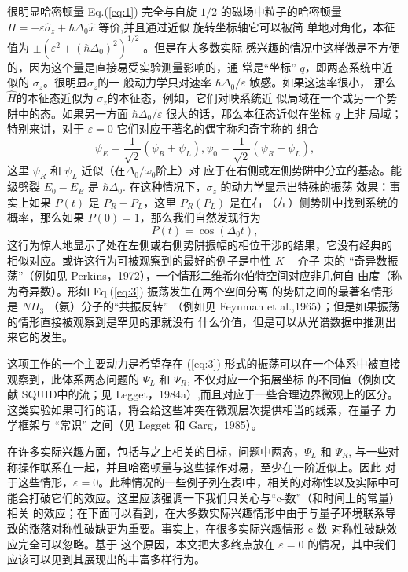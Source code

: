 很明显哈密顿量 Eq.(\ref{eq:1}) 完全与自旋 $1/2$ 的磁场中粒子的哈密顿量
$H=-\varepsilon\hat{\sigma}_{z}+\hbar\Delta_{0}\hat{x}$ 等价,并且通过近似
旋转坐标轴它可以被简 单地对角化，本征值为
$\pm(\varepsilon^{2}+(\hbar\Delta_{0})^{2})^{1/2}$ 。但是在大多数实际
感兴趣的情况中这样做是不方便的，因为这个量是直接易受实验测量影响的，通
常是“坐标” $q$，即两态系统中近似的 $\sigma_{z}$。很明显$\sigma_{z}$的一
般动力学只对速率 $\hbar\Delta_{0}/\varepsilon$ 敏感。如果这速率很小，
那么$\hat{H}$的本征态近似为 $\sigma_{z}$的本征态，例如，它们对映系统近
似局域在一个或另一个势阱中的态。如果另一方面
$\hbar\Delta_{0}/\varepsilon$ 很大的话，那么本征态近似在坐标 $q$ 上非
局域；特别来讲，对于 $\varepsilon=0$ 它们对应于著名的偶宇称和奇宇称的
组合
\begin{equation}
  \label{eq:2}
  \psi_{E}= \frac{1}{\sqrt{2}}(\psi_{R}+\psi_{L}),\psi_{0}=\frac{1}{\sqrt{2}}(\psi_{R}-\psi_{L}),
\end{equation}
这里 $\psi_{R}$ 和 $\psi_{L}$ 近似（在$\Delta_{0}/\omega_{0}$阶上）对
应于在右侧或左侧势阱中分立的基态。能级劈裂 $E_{0}-E_{E}$ 是
$\hbar\Delta_{0}$. 在这种情况下，$\sigma_{z}$ 的动力学显示出特殊的振荡
效果：事实上如果 $P(t)$ 是 $P_{R}-P_{L}$，这里 $P_{R}(P_{L})$ 是在右
（左）侧势阱中找到系统的概率，那么如果 $P(0)=1$，那么我们自然发现行为
\begin{equation}
  \label{eq:3}
  P(t)=\cos(\Delta_{0}t),
\end{equation}
这行为惊人地显示了处在左侧或右侧势阱振幅的相位干涉的结果，它没有经典的
相似对应。或许这行为可被观察到的最好的例子是中性 $K-\text{介子}$ 束的
“奇异数振荡”（例如见 Perkins，1972），一个情形二维希尔伯特空间对应非几何自
由度（称为奇异数）。形如 Eq.(\ref{eq:3}) 振荡发生在两个空间分离
的势阱之间的最著名情形是 $NH_{3}$ （氨）分子的“共振反转” （例如见
Feynman et al.,1965）；但是如果振荡的情形直接被观察到是罕见的那就没有
什么价值，但是可以从光谱数据中推测出来它的发生。

这项工作的一个主要动力是希望存在 (\ref{eq:3}) 形式的振荡可以在一个体系中被直接观察到，此体系两态问题的 $\Psi_{L}$ 和 $\Psi_{R}$, 不仅对应一个拓展坐标
的不同值（例如文献 SQUID中的流；见 Legget，1984a）,而且对应于一些合理边界微观上的区分。这类实验如果可行的话，将会给这些冲突在微观层次提供相当的线索，在量子
力学框架与 “常识” 之间（见 Legget 和 Garg，1985）。

在许多实际兴趣方面，包括与之上相关的目标，问题中两态，$\Psi_{L}$ 和 $\Psi_{R}$, 与一些对称操作联系在一起，并且哈密顿量与这些操作对易，至少在一阶近似上。因此
对于这些情形，$\varepsilon=0$。此种情况的一些例子列在表I中，相关的对称性以及实际中可能会打破它们的效应。这里应该强调一下我们只关心与“c-数”（和时间上的常量）相关
的效应；在下面可以看到，在大多数实际兴趣情形中由于与量子环境联系导致的涨落对称性破缺更为重要。事实上，在很多实际兴趣情形 c-数 对称性破缺效应完全可以忽略。基于
这个原因，本文把大多终点放在 $\varepsilon=0$ 的情况，其中我们应该可以见到其展现出的丰富多样行为。

